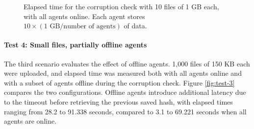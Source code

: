 \begin{figure}[!ht]
\centering
{}
\caption{Elapsed time for the corruption check with 10 files of 1 GB each, with all agents online. Each agent stores $10 \times (1 \text{ GB} / \text{number of agents})$ of data.}
\label{fig:test-5}
\end{figure}
\newpage
\paragraph{Test 4: Small files, partially offline agents}

The third scenario evaluates the effect of offline agents. 1,000 files of 150 KB
each were uploaded, and elapsed time was measured both with all agents online
and with a subset of agents offline during the corruption check.
Figure \ref{fig:test-3} compares the two configurations. Offline agents
introduce additional latency due to the timeout before retrieving the previous
saved hash, with elapsed times ranging from 28.2 to 91.338 seconds, compared to 3.1 to 69.221 seconds when all agents are online.

